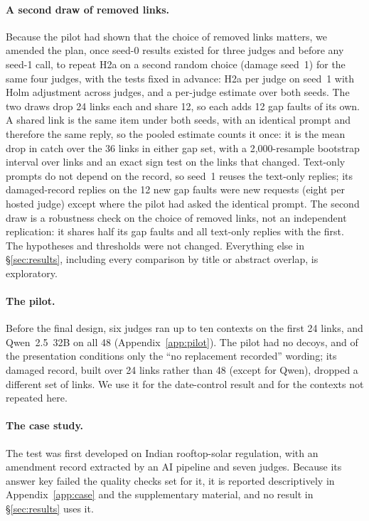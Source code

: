 \paragraph{A second draw of removed links.} Because the pilot had shown that the choice of removed links matters, we
amended the plan, once seed-0 results existed for three judges and before any seed-1 call, to repeat H2a on a second
random choice (damage seed~1) for the same four judges, with the tests fixed in advance: H2a per judge on seed~1 with Holm adjustment across judges, and a per-judge estimate over both seeds. The
two draws drop 24 links each and share 12, so each adds 12 gap faults of its own. A shared link is the same item under
both seeds, with an identical prompt and therefore the same reply, so the pooled estimate counts it once: it is the
mean drop in catch over the 36 links in either gap set, with a 2,000-resample bootstrap interval over links and an exact
sign test on the links that changed. Text-only prompts do not depend on the record, so seed~1 reuses the text-only
replies; its damaged-record replies on the 12 new gap faults were new requests (eight per hosted judge) except where the
pilot had asked the identical prompt. The second draw is a robustness check on the choice of removed links, not an independent replication: it shares half
its gap faults and all text-only replies with the first. The hypotheses and thresholds were not changed. Everything else in
\S\ref{sec:results}, including every comparison by title or abstract overlap, is exploratory.

\paragraph{The pilot.}
Before the final design, six judges ran up to ten contexts on the first 24 links, and Qwen~2.5~32B on all 48
(Appendix~\ref{app:pilot}). The pilot had no decoys, and of the presentation conditions only the ``no replacement
recorded'' wording; its damaged record, built over 24 links rather than 48 (except for Qwen), dropped a different set
of links. We use it for the date-control result and for the contexts not repeated here.

\paragraph{The case study.}
The test was first developed on Indian rooftop-solar regulation, with an amendment record extracted by an AI pipeline
and seven judges. Because its answer key failed the quality checks set for it, it is reported descriptively in
Appendix~\ref{app:case} and the supplementary material, and no result in \S\ref{sec:results} uses it.


